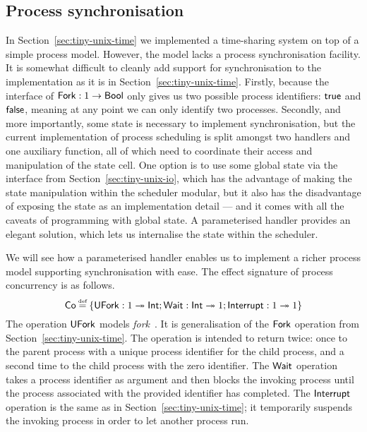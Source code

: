 \documentclass[12pt,phd,lfcs,twoside,openright,logo,leftchapter,normalheadings]{infthesis}
\theoremstyle{plain}
\theoremstyle{definition}
\begin{document}
\subsection{Process synchronisation}
%
In Section~\ref{sec:tiny-unix-time} we implemented a time-sharing
system on top of a simple process model. However, the model lacks a
process synchronisation facility. It is somewhat difficult to cleanly
add support for synchronisation to the implementation as it is in
Section~\ref{sec:tiny-unix-time}. Firstly, because the interface of
$\mathsf{Fork} : 1 \to \mathsf{Bool}$ only gives us two possible process
identifiers: $\mathsf{true}$ and $\mathsf{false}$, meaning at any point we can only
identify two processes. Secondly, and more importantly, some state is
necessary to implement synchronisation, but the current implementation
of process scheduling is split amongst two handlers and one auxiliary
function, all of which need to coordinate their access and
manipulation of the state cell. One option is to use some global state
via the interface from Section~\ref{sec:tiny-unix-io}, which has the
advantage of making the state manipulation within the scheduler
modular, but it also has the disadvantage of exposing the state as an
implementation detail --- and it comes with all the caveats of
programming with global state. A parameterised handler provides an
elegant solution, which lets us internalise the state within the
scheduler.

We will see how a parameterised handler enables us to implement a
richer process model supporting synchronisation with ease. The effect
signature of process concurrency is as follows.
%
\[
  \Co \defas \{\UFork : \UnitType \opto \Int; \Wait : \Int \opto \UnitType; \Interrupt : \UnitType \opto \UnitType\}
\]
%
The operation $\mathsf{UFork}$ models \UNIX{}
\emph{fork}~\cite{RitchieT74}. It is generalisation of the $\mathsf{Fork}$
operation from Section~\ref{sec:tiny-unix-time}. The operation is
intended to return twice: once to the parent process with a unique
process identifier for the child process, and a second time to the
child process with the zero identifier. The $\mathsf{Wait}$ operation takes a
process identifier as argument and then blocks the invoking process
until the process associated with the provided identifier has
completed. The $\mathsf{Interrupt}$ operation is the same as in
Section~\ref{sec:tiny-unix-time}; it temporarily suspends the invoking
process in order to let another process run.
\end{document}
